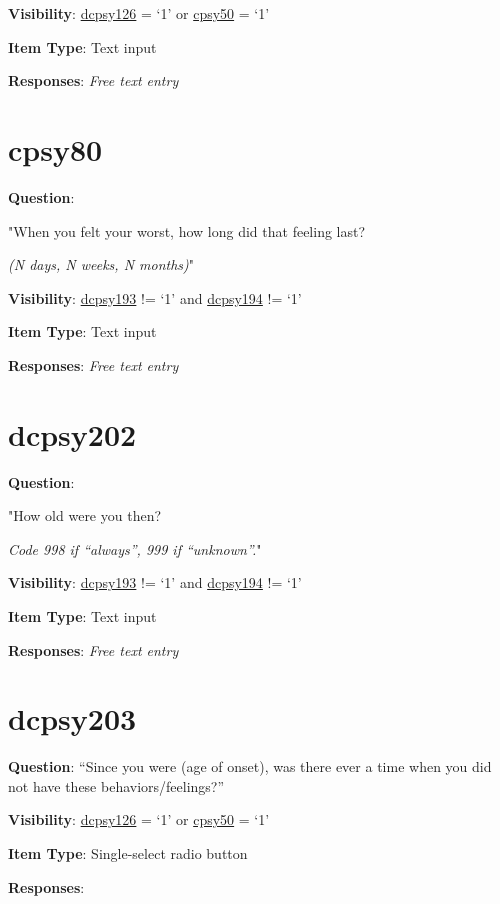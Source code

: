 \documentclass[]{book}
\begin{document}
\textbf{Visibility}: \protect\hyperlink{dcpsy126}{dcpsy126} = `1' or \protect\hyperlink{cpsy50}{cpsy50} = `1'

\textbf{Item Type}: Text input

\textbf{Responses}: \emph{Free text entry}

\hypertarget{cpsy80}{%
\section{cpsy80}\label{cpsy80}}

\textbf{Question}:

"When you felt your worst, how long did that feeling last?

\emph{(N days, N weeks, N months)}"

\textbf{Visibility}: \protect\hyperlink{dcpsy193}{dcpsy193} != `1' and \protect\hyperlink{dcpsy194}{dcpsy194} != `1'

\textbf{Item Type}: Text input

\textbf{Responses}: \emph{Free text entry}

\hypertarget{dcpsy202}{%
\section{dcpsy202}\label{dcpsy202}}

\textbf{Question}:

"How old were you then?

\emph{Code 998 if ``always'', 999 if ``unknown''.}"

\textbf{Visibility}: \protect\hyperlink{dcpsy193}{dcpsy193} != `1' and \protect\hyperlink{dcpsy194}{dcpsy194} != `1'

\textbf{Item Type}: Text input

\textbf{Responses}: \emph{Free text entry}

\hypertarget{dcpsy203}{%
\section{dcpsy203}\label{dcpsy203}}

\textbf{Question}: ``Since you were (age of onset), was there ever a time when you did not have these behaviors/feelings?''

\textbf{Visibility}: \protect\hyperlink{dcpsy126}{dcpsy126} = `1' or \protect\hyperlink{cpsy50}{cpsy50} = `1'

\textbf{Item Type}: Single-select radio button

\textbf{Responses}:
\end{document}
